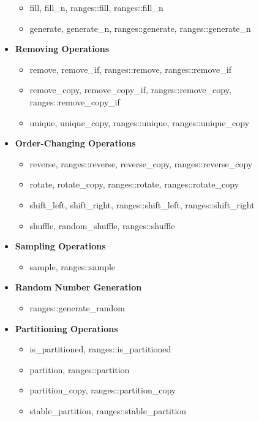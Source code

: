 \documentclass{article}
\begin{document}
\begin{itemize}
\begin{itemize}
            \item fill, fill\_n, ranges::fill, ranges::fill\_n
            \item generate, generate\_n, ranges::generate, ranges::generate\_n
          \end{itemize}
        \item \textbf{Removing Operations}
          \begin{itemize}
            \item remove, remove\_if, ranges::remove, ranges::remove\_if
            \item remove\_copy, remove\_copy\_if, ranges::remove\_copy, ranges::remove\_copy\_if
            \item unique, unique\_copy, ranges::unique, ranges::unique\_copy
          \end{itemize}
        \item \textbf{Order-Changing Operations}
          \begin{itemize}
            \item reverse, ranges::reverse, reverse\_copy, ranges::reverse\_copy
            \item rotate, rotate\_copy, ranges::rotate, ranges::rotate\_copy
            \item shift\_left, shift\_right, ranges::shift\_left, ranges::shift\_right
            \item shuffle, random\_shuffle, ranges::shuffle
          \end{itemize}
        \item \textbf{Sampling Operations}
          \begin{itemize}
            \item sample, ranges::sample
          \end{itemize}
        \item \textbf{Random Number Generation}
          \begin{itemize}
            \item ranges::generate\_random
          \end{itemize}
        \item \textbf{Partitioning Operations}
          \begin{itemize}
            \item is\_partitioned, ranges::is\_partitioned
            \item partition, ranges::partition
            \item partition\_copy, ranges::partition\_copy
            \item stable\_partition, ranges::stable\_partition

\end{itemize}
\end{itemize}
\end{document}
